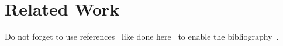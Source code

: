 
\chapter{Related Work}
\label{sec:relatedWork}

\Blindtext[12] Do not forget to use references~\cite{Hanser2019energy} like done here~\cite{Hofmann2019dependentVectors} to enable the bibliography~\cite{Jung2017tumble, Sagrista2019GaiaSky, Sdeo2018fullerene, Zheng2019equivalence}.